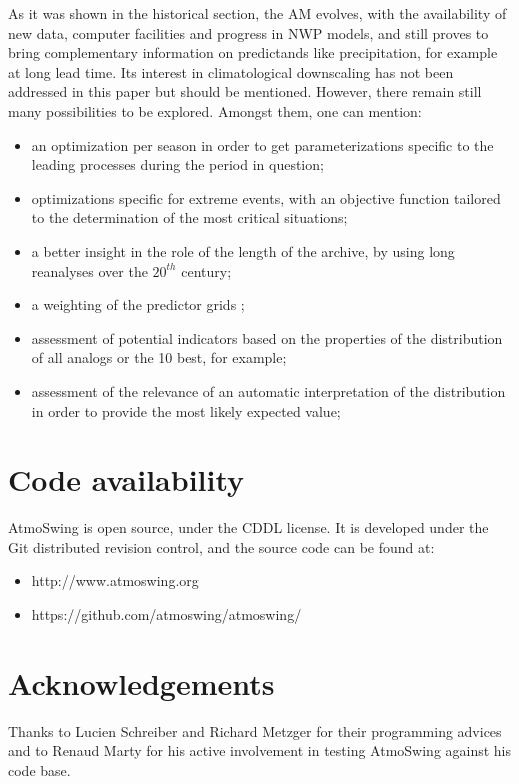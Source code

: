 \documentclass[review]{elsarticle}
\begin{document}
As it was shown in the historical section, the AM evolves, with the availability of new data, computer facilities and progress in NWP models, and still proves to bring complementary information on predictands like precipitation, for example at long lead time. Its interest in climatological downscaling has not been addressed in this paper but should be mentioned. However, there remain still many possibilities to be explored. Amongst them, one can mention:

\begin{itemize}
	\item an optimization per season in order to get parameterizations specific to the leading processes during the period in question;
	\item optimizations specific for extreme events, with an objective function tailored to the determination of the most critical situations;
	\item a better insight in the role of the length of the archive, by using long reanalyses over the $20^{th}$ century;	
	\item a weighting of the predictor grids \citep[see][]{Bliefernicht2010};
	\item assessment of potential indicators based on the properties of the distribution of all analogs or the 10 best, for example;
	\item assessment of the relevance of an automatic interpretation of the distribution in order to provide the most likely expected value;
\end{itemize}


\section*{Code availability}

AtmoSwing is open source, under the CDDL license. It is developed under the Git distributed revision control, and the source code can be found at:

\begin{itemize}
	\item http://www.atmoswing.org
	\item https://github.com/atmoswing/atmoswing/
\end{itemize}


\section*{Acknowledgements}
Thanks to Lucien Schreiber and Richard Metzger for their programming advices and to Renaud Marty for his active involvement in testing AtmoSwing against his code base.
\end{document}
